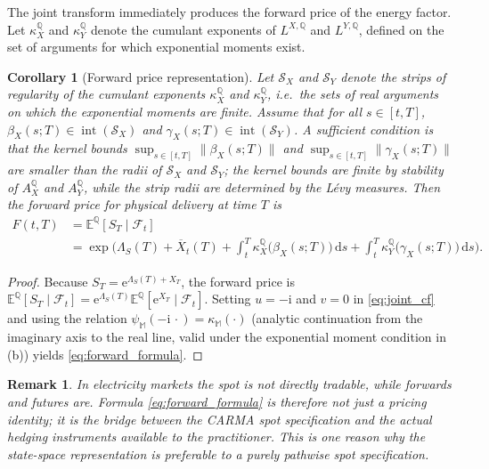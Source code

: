 \documentclass[10pt,reqno]{amsart}
\newtheorem{corollary}[theorem]{Corollary}
\newtheorem{remark}[theorem]{Remark}
\newcommand{\E}{\mathbb{E}}
\newcommand{\Q}{\mathbb{Q}}
\newcommand{\F}{\mathcal{F}}
\newcommand{\1}{\mathbbm{1}}
\newcommand{\dd}{\mathrm{d}}
\newcommand{\ii}{\mathrm{i}}
\newcommand{\ee}{\mathrm{e}}
\begin{document}
The joint transform immediately produces the forward price of the energy factor.
Let $\kappa_X^\Q$ and $\kappa_Y^\Q$ denote the cumulant exponents of
$L^{X,\Q}$ and $L^{Y,\Q}$, defined on the set of arguments for which
exponential moments exist.

\begin{corollary}[Forward price representation]
\label{cor:forward_price}
Let $\mathcal{S}_X$ and $\mathcal{S}_Y$ denote the strips of regularity of
the cumulant exponents $\kappa_X^\Q$ and $\kappa_Y^\Q$, i.e.\ the sets of
real arguments on which the exponential moments are finite. Assume that for
all $s \in [t,T]$, $\beta_X(s;T) \in \operatorname{int}(\mathcal{S}_X)$
and $\gamma_X(s;T) \in \operatorname{int}(\mathcal{S}_Y)$. A sufficient
condition is that the kernel bounds
$\sup_{s \in [t,T]}\|\beta_X(s;T)\|$ and
$\sup_{s \in [t,T]}\|\gamma_X(s;T)\|$ are smaller than the radii of
$\mathcal{S}_X$ and $\mathcal{S}_Y$; the kernel bounds are finite by
stability of $A_X^\Q$ and $A_Y^\Q$, while the strip radii are determined
by the Lévy measures.
Then the forward price for physical delivery at time $T$ is
\begin{align}
  F(t,T)
  &= \E^\Q[S_T \mid \F_t] \nonumber\\
  &= \exp\Bigg(
      \Lambda_S(T)
      + \overline{X}_t(T)
      + \int_t^T \kappa_X^\Q\!\big(\beta_X(s;T)\big)\,\dd s
      + \int_t^T \kappa_Y^\Q\!\big(\gamma_X(s;T)\big)\,\dd s
    \Bigg).
    \label{eq:forward_formula}
\end{align}
\end{corollary}

\begin{proof}
Because $S_T = \ee^{\Lambda_S(T)+X_T}$, the forward price is
$\E^\Q[S_T\mid\F_t] = \ee^{\Lambda_S(T)} \E^\Q[\ee^{X_T}\mid\F_t]$.
Setting $u = -\ii$ and $v = 0$ in \eqref{eq:joint_cf} and using the
relation $\psi_{\mathbb{M}}(-\ii\,\cdot) = \kappa_{\mathbb{M}}(\cdot)$
(analytic continuation from the imaginary axis to the real line, valid under
the exponential moment condition in (b)) yields
\eqref{eq:forward_formula}.
\end{proof}

\begin{remark}
In electricity markets the spot is not directly tradable, while forwards and
futures are. Formula \eqref{eq:forward_formula} is therefore not just a pricing
identity; it is the bridge between the CARMA spot specification and the actual
hedging instruments available to the practitioner. This is one reason why the
state-space representation is preferable to a purely pathwise spot specification.
\end{remark}
\end{document}
